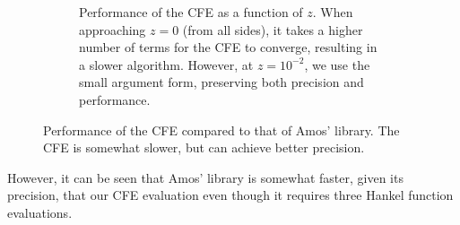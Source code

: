 \begin{figure}
\begin{subfigure}[t]{0.47\textwidth}
  \caption{Performance of the CFE as a function of $z$. When approaching
  $z=0$ (from all sides), it takes a higher number of terms for the 
  CFE to converge, resulting in a slower algorithm. However, at $z=10^{-2}$, we 
  use the small argument form, preserving both precision and performance.}
 \end{subfigure}
 \caption[Performance of the CFE compared to Amos' library's.]
	 {Performance of the CFE compared to that of Amos' library. The CFE is somewhat
	 slower, but can achieve better precision.}
\end{figure}


However, it can be seen that Amos' library is somewhat faster, given its
precision, that our CFE evaluation 
even though it requires three Hankel function evaluations. 



